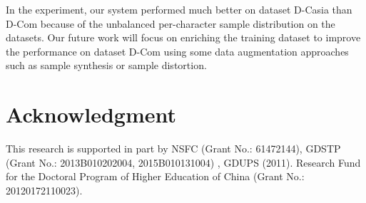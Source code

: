 \documentclass[10pt,conference,a4paper]{IEEEtran}
\begin{document}
In the experiment, our system performed much better on dataset D-Casia than D-Com because of the unbalanced per-character sample distribution on the datasets. Our future work will focus on enriching the training dataset to improve the performance on dataset D-Com using some data augmentation approaches such as sample synthesis or sample distortion.




\section*{Acknowledgment}
This research is supported in part by NSFC (Grant No.: 61472144), GDSTP (Grant No.: 2013B010202004, 2015B010131004) , GDUPS (2011). Research Fund for the Doctoral Program of Higher Education of China (Grant No.: 20120172110023).



\end{document}
